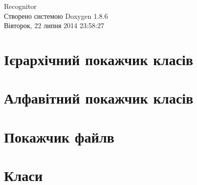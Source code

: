 \documentclass[twoside]{book}
\newcommand{\clearemptydoublepage}{%
  \newpage{\pagestyle{empty}\cleardoublepage}%
}
\begin{document}
\hypersetup{pageanchor=false}
\begin{titlepage}
\vspace*{7cm}
\begin{center}%
{\Large Recognitor }\\
\vspace*{1cm}
{\large Створено системою Doxygen 1.8.6}\\
\vspace*{0.5cm}
{\small Вівторок, 22 липня 2014 23:58:27}\\
\end{center}
\end{titlepage}
\clearemptydoublepage
\tableofcontents
\clearemptydoublepage
{}
\hypersetup{pageanchor=true}

\chapter{Ієрархічний покажчик класів}

\chapter{Алфавітний покажчик класів}

\chapter{Покажчик файлв}

\chapter{Класи}



























\end{document}
